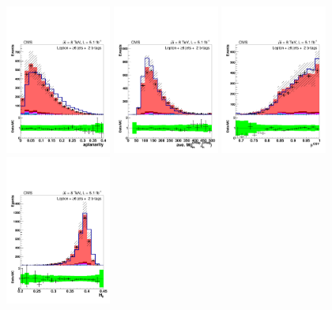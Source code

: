 \begin{figure}[hbtp]
 \begin{center}
   \includegraphics[width=0.31\textwidth]{Figures/Analysis_1_Diagrams/d2MCPlots_aplanarity_cut3_jge6_t2_Combined_HtWgt.pdf}
   \includegraphics[width=0.31\textwidth]{Figures/Analysis_1_Diagrams/d2MCPlots_avg_untagged_dijet_mass_cut3_jge6_t2_Combined_HtWgt.pdf}
   \includegraphics[width=0.31\textwidth]{Figures/Analysis_1_Diagrams/d2MCPlots_avg_btag_disc_btags_cut3_jge6_t2_Combined_HtWgt.pdf}
   \includegraphics[width=0.31\textwidth]{Figures/Analysis_1_Diagrams/d2MCPlots_h0_cut3_jge6_t2_Combined_HtWgt.pdf}

\end{center}
\end{figure}
